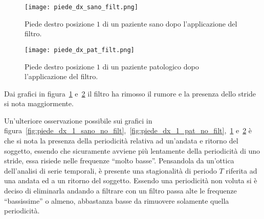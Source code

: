 \begin{figure}[H]
    \centering
    \texttt{[image: piede\_dx\_sano\_filt.png]}
    \caption{Piede destro posizione $1$ di un paziente sano dopo l'applicazione del filtro.}
    \label{fig:piede_dx_1_sano_filt}
\end{figure}

\begin{figure}[H]
    \centering
    \texttt{[image: piede\_dx\_pat\_filt.png]}
    \caption{Piede destro posizione $1$ di un paziente patologico dopo l'applicazione del filtro.}
    \label{fig:piede_dx_1_pat_filt}
\end{figure}

Dai grafici in figura~\ref{fig:piede_dx_1_sano_filt} 
e~\ref{fig:piede_dx_1_pat_filt} il filtro ha rimosso il rumore e la presenza dello stride
si nota maggiormente.

Un'ulteriore osservazione possibile sui grafici in figura~\ref{fig:piede_dx_1_sano_no_filt},~\ref{fig:piede_dx_1_pat_no_filt},~\ref{fig:piede_dx_1_sano_filt} 
e~\ref{fig:piede_dx_1_pat_filt} è che si nota la presenza della periodicità
relativa ad un'andata e ritorno del soggetto,
essendo che sicuramente avviene più lentamente della periodicità di uno stride, essa
risiede nelle frequenze ``molto basse''. Pensandola da un'ottica dell'analisi
di serie temporali, è presente una stagionalità di periodo $T$ riferita ad una andata
ed a un ritorno del soggetto. Essendo una periodicità non voluta si è deciso di eliminarla
andando a filtrare con un filtro passa alte le frequenze ``bassissime'' o almeno,
abbastanza basse da rimuovere solamente quella periodicità.
